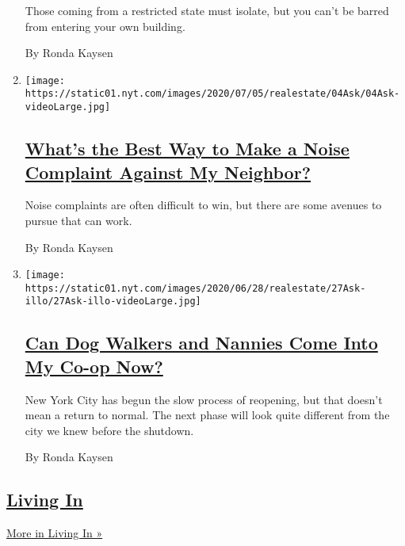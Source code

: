 \begin{enumerate}
  Those coming from a restricted state must isolate, but you can't be
  barred from entering your own building.

  By Ronda Kaysen
\item
  \texttt{[image: https://static01.nyt.com/images/2020/07/05/realestate/04Ask/04Ask-videoLarge.jpg]}

  \hypertarget{whats-the-best-way-to-make-a-noise-complaint-against-my-neighbor}{%
  \subsection{\texorpdfstring{\href{/2020/07/04/realestate/whats-the-best-way-to-make-a-noise-complaint-against-my-neighbor.html}{What's
  the Best Way to Make a Noise Complaint Against My
  Neighbor?}}{What's the Best Way to Make a Noise Complaint Against My Neighbor?}}\label{whats-the-best-way-to-make-a-noise-complaint-against-my-neighbor}}

  Noise complaints are often difficult to win, but there are some
  avenues to pursue that can work.

  By Ronda Kaysen
\item
  \texttt{[image: https://static01.nyt.com/images/2020/06/28/realestate/27Ask-illo/27Ask-illo-videoLarge.jpg]}

  \hypertarget{can-dog-walkers-and-nannies-come-into-my-co-op-now}{%
  \subsection{\texorpdfstring{\href{/2020/06/29/realestate/coronavirus-phase-2-dog-walkers-nannies-co-op.html}{Can
  Dog Walkers and Nannies Come Into My Co-op
  Now?}}{Can Dog Walkers and Nannies Come Into My Co-op Now?}}\label{can-dog-walkers-and-nannies-come-into-my-co-op-now}}

  New York City has begun the slow process of reopening, but that
  doesn't mean a return to normal. The next phase will look quite
  different from the city we knew before the shutdown.

  By Ronda Kaysen
\end{enumerate}

\hypertarget{living-in}{%
\subsection{\texorpdfstring{\href{/column/living-in}{Living
In}}{Living In}}\label{living-in}}

\href{/column/living-in}{More in Living In »}

